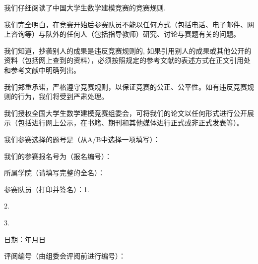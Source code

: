 {

我们仔细阅读了中国大学生数学建模竞赛的竞赛规则.

我们完全明白，在竞赛开始后参赛队员不能以任何方式（包括电话、电子邮件、网上咨询等）与队外的任何人（包括指导教师）研究、讨论与赛题有关的问题。

我们知道，抄袭别人的成果是违反竞赛规则的, 如果引用别人的成果或其他公开的资料（包括网上查到的资料），必须按照规定的参考文献的表述方式在正文引用处和参考文献中明确列出。

我们郑重承诺，严格遵守竞赛规则，以保证竞赛的公正、公平性。如有违反竞赛规则的行为，我们将受到严肃处理。

我们授权全国大学生数学建模竞赛组委会，可将我们的论文以任何形式进行公开展示（包括进行网上公示，在书籍、期刊和其他媒体进行正式或非正式发表等）。

我们参赛选择的题号是（从A/B中选择一项填写）：\underline{\makebox[12\ccwd][c]{\NumberProblem}}

我们的参赛报名号为（报名编号）：\underline{\makebox[12\ccwd][c]{\NumberNJUSTMathModeling}}

所属学院（请填写完整的全名）：\underline{\makebox[20\ccwd][c]{\MembersCollege}}

参赛队员（打印并签名）：1.\underline{\makebox[12\ccwd][c]{\MemberOne}}

\makebox[11.5\ccwd][c]{}2.\underline{\makebox[12\ccwd][c]{\MemberTwo}}

\makebox[11.5\ccwd][c]{}3.\underline{\makebox[12\ccwd][c]{\MemberThree}}

\begin{flushright}
日期：\underline{\makebox[4\ccwd][c]{\Year}}年\underline{\makebox[4\ccwd][c]{\Month}}月\underline{\makebox[4\ccwd][c]{\Day}}日
\end{flushright}

}

\hrulefill

{评阅编号（由组委会评阅前进行编号）：}

\restoregeometry
\setcounter{page}{1}

\fi

